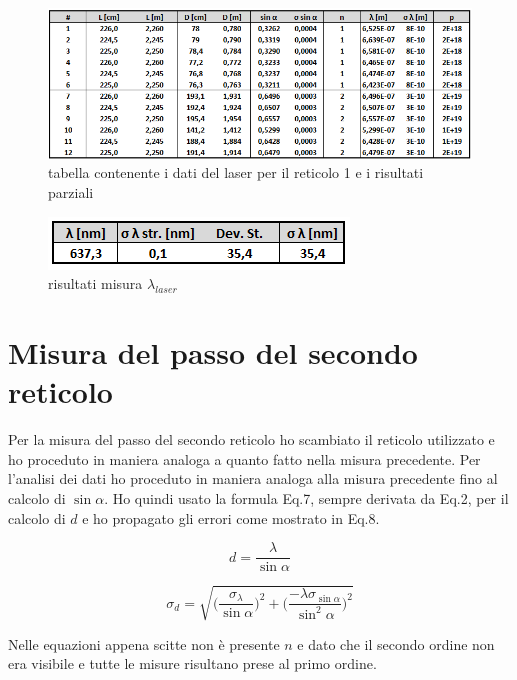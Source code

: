 \documentclass{article}
\begin{document}
\begin{figure}[h!]
  \centering
  \includegraphics[width=1\linewidth]{IM tabella laser 1}
  \caption{tabella contenente i dati del laser per il reticolo 1 e i risultati parziali}
\end{figure}

\begin{figure}[h!]
  \centering
  \includegraphics[width=0.4\linewidth]{IM risultati laser 1}
  \caption{risultati misura $\lambda_{laser}$}
\end{figure}




\pagebreak
\section{Misura del passo del secondo reticolo}
Per la misura del passo del secondo reticolo ho scambiato il reticolo utilizzato e ho proceduto in maniera analoga a quanto fatto nella misura precedente. Per l'analisi dei dati ho proceduto in maniera analoga alla misura precedente fino al calcolo di $\sin \alpha$. Ho quindi usato la formula Eq.7, sempre derivata da Eq.2, per il calcolo di $d$ e ho propagato gli errori come mostrato in Eq.8.

\begin{equation}
 d = \frac{\lambda}{\sin \alpha}
\end{equation}

\begin{equation}
 \sigma_d = \sqrt{ \bigg( \frac{\sigma_\lambda}{\sin \alpha} \bigg)^2 + \bigg( \frac{- \lambda \sigma_{\sin \alpha}}{\sin^2 \alpha} \bigg)^2 }
\end{equation}

Nelle equazioni appena scitte non è presente $n$ e dato che il secondo ordine non era visibile e tutte le misure risultano prese al primo ordine.
\end{document}

